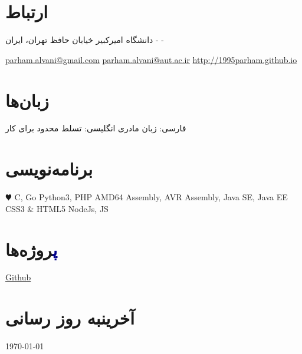 \documentclass[]{friggeri-cv-fa} %
\begin{document}



\begin{aside} %
\section{\textcolor{TextYellow}{ا}رتباط}
دانشگاه امیرکبیر
خیابان حافظ
تهران، ایران
-
-
\begin{latin}
\href{mailto:parham.alvani@gmail.com}{parham.alvani@gmail.com}
\href{mailto:parham.alvani@aut.ac.ir}{parham.alvani@aut.ac.ir}
\href{http://1995parham.github.io}{http://1995parham.github.io}
\end{latin}
\section{\textcolor{TextOrange}{ز}بان‌ها}
فارسی:
زبان مادری
انگلیسی:
تسلط محدود برای کار
\section{\textcolor{TextGreen}{ب}رنامه‌نویسی}
\begin{latin}
{\color{red} $\varheartsuit$} C, Go
Python3, PHP
AMD64 Assembly,
AVR Assembly,
Java SE, Java EE
CSS3 \& HTML5
NodeJs, JS
\end{latin}
\section{\textcolor{DarkBlue}{پ}روژه‌ها}
\begin{latin}
\href{https://github.com/1995parham}{\textcolor{TextGreen}{Github}}
\end{latin}
\section{\textcolor{Ocean}{آخرین}به روز رسانی}
\today
\end{aside}

\end{document}

